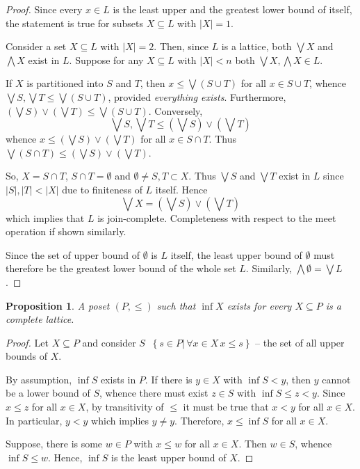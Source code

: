 \documentclass[a4paper]{article}
\newcommand{\obj}[1]{{\left\{ #1 \right \}}}
\newcommand{\induc}[1]{{\left . #1 \right \vert}}
\newcommand{\abs}[1]{{\left | #1 \right |}}
\newtheorem{prop}{Proposition}
\newcommand{\defn}{\mathop{\overset{\Delta}{=}}\nolimits}
\begin{document}
\begin{proof}
Since every $x\in L$ is the least upper and the greatest lower bound of itself, the statement is true for subsets $X\subseteq L$ with $\abs{X}=1$.

Consider a set $X\subseteq L$ with $\abs{X}=2$. Then, since $L$ is a lattice, both $\bigvee X$ and $\bigwedge X$ exist in $L$. Suppose for any $X\subseteq L$ with $\abs{X}<n$ both $\bigvee X, \bigwedge X \in L$.

If $X$ is partitioned into $S$ and $T$, then $x\leq \bigvee (S\cup T)$ for all $x\in S\cup T$, whence $\bigvee S,\bigvee T\leq \bigvee (S\cup T)$, provided \emph{everything exists}. Furthermore, $(\bigvee S)\vee (\bigvee T)\leq \bigvee (S\cup T)$. Conversely, \[\bigvee S,\bigvee T \leq (\bigvee S)\vee (\bigvee T)\] whence $x\leq (\bigvee S)\vee (\bigvee T)$ for all $x\in S\cap T$. Thus $\bigvee (S \cap T)\leq (\bigvee S)\vee (\bigvee T)$.

So, $X=S\cap T$, $S\cap T = \emptyset$ and $\emptyset\neq S,T\subset X$. Thus $\bigvee S$ and $\bigvee T$ exist in $L$ since $\abs{S},\abs{T}<\abs{X}$ due to finiteness of $L$ itself. Hence \[\bigvee X = (\bigvee S)\vee (\bigvee T)\] which implies that $L$ is join-complete. Completeness with respect to the meet operation if shown similarly.

Since the set of upper bound of $\emptyset$ is $L$ itself, the least upper bound of $\emptyset$ must therefore be the greatest lower bound of the whole set $L$. Similarly, $\bigwedge \emptyset = \bigvee L$.
\end{proof}

\begin{prop} A poset $(P,\leq)$ such that $\inf X$ exists for every $X\subseteq P$ is a complete lattice.
\end{prop}

\begin{proof}
Let $X\subseteq P$ and consider $S\defn \obj{\induc{s\in P}\,\forall x\in X\, x\leq s}$ -- the set of all upper bounds of $X$.

By assumption, $\inf S$ exists in $P$. If there is $y\in X$ with $\inf S < y$, then $y$ cannot be a lower bound of $S$, whence there must exist $z\in S$ with $\inf S\leq z<y$. Since $x\leq z$ for all $x\in X$, by transitivity of $\leq$ it must be true that $x<y$ for all $x\in X$. In particular, $y<y$ which implies $y\neq y$. Therefore, $x\leq \inf S$ for all $x\in X$.

Suppose, there is some $w\in P$ with $x\leq w$ for all $x\in X$. Then $w\in S$, whence $\inf S \leq w$. Hence, $\inf S$ is the least upper bound of $X$.

\end{proof}
\end{document}

